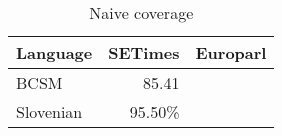\begin{table}
\begin{tabular}{lrr}

\textbf{Language} & \textbf{SETimes} & \textbf{Europarl}\\
\hline
BCSM & 85.41 &  \\
Slovenian & 95.50\% & \\
\hline
\end{tabular}
\caption{ Naive coverage }
\label{table:coverage}
\end{table}

